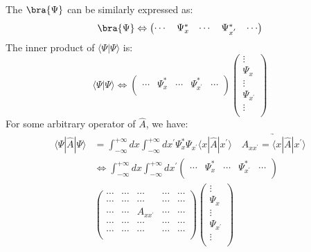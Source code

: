 The $\bra{\Psi}$ can be similarly expressed as:
\begin{equation}
  \label{PRAMReq:17}
  \bra{\Psi} \Leftrightarrow
  \begin{pmatrix}
  \cdots & \Psi^{*}_{x} & \cdots & \Psi^{*}_{x^{'}} & \cdots \\
  \end{pmatrix}
\end{equation}
The inner product of $\langle\Psi|\Psi\rangle$ is:
\begin{equation}
  \label{PRAMReq:18}
  \langle\Psi|\Psi\rangle \Leftrightarrow
  \begin{pmatrix}
  \cdots & \Psi^{*}_{x} & \cdots & \Psi^{*}_{x^{'}} & \cdots \\
  \end{pmatrix}
  \begin{pmatrix}
  \vdots \\
  \Psi_{x} \\
  \vdots \\
  \Psi_{x^{'}} \\
  \vdots \\
  \end{pmatrix}
\end{equation}
For some arbitrary operator of $\hat{A}$, we have:
\begin{equation}
  \label{PRAMReq:19}
  \begin{split}
    \langle\Psi|\hat{A}|\Psi\rangle &=
\int^{+\infty}_{-\infty}dx \int^{+\infty}_{-\infty}dx^{'}
   \Psi^{*}_{x}\Psi_{x^{'}} \langle x|\hat{A}|x^{'}\rangle
\quad
\underrightarrow{A_{xx^{'}} = \langle x|\hat{A}|x^{'}\rangle} \\
&\Leftrightarrow
\int^{+\infty}_{-\infty}dx \int^{+\infty}_{-\infty}dx^{'}
  \begin{pmatrix}
  \cdots & \Psi^{*}_{x} & \cdots & \Psi^{*}_{x^{'}} & \cdots \\
  \end{pmatrix} \\
&  \begin{pmatrix}
    \cdots & \cdots & \cdots & \cdots & \cdots \\
    \cdots & \cdots & \cdots & \cdots & \cdots \\
    \cdots & \cdots & A_{xx^{'}} & \cdots & \cdots \\
    \cdots & \cdots & \cdots & \cdots & \cdots \\
    \cdots & \cdots & \cdots & \cdots & \cdots \\
  \end{pmatrix}
  \begin{pmatrix}
  \vdots \\
  \Psi_{x} \\
  \vdots \\
  \Psi_{x^{'}} \\
  \vdots \\
  \end{pmatrix}
  \end{split}
\end{equation}

